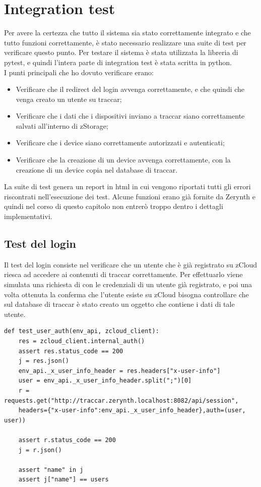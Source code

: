 \documentclass[a4paper,titlepage,12pt]{book}
\begin{document}
\sffamily
\chapter{\sffamily
Integration test}
Per avere la certezza che tutto il sistema sia stato correttamente integrato e che tutto funzioni correttamente, è stato necessario realizzare una suite di test per verificare questo punto. Per testare il sistema è stata utilizzata la libreria di pytest, e quindi l'intera parte di integration test è stata scritta in python.\\
I punti principali che ho dovuto verificare erano:
\begin{itemize}
\item Verificare che il redirect del login avvenga correttamente, e che quindi che venga creato un utente su traccar;

\item Verificare che i dati che i dispositivi inviano a traccar siano correttamente salvati all'interno di zStorage;

\item Verificare che i device siano correttamente autorizzati e autenticati;

\item Verificare che la creazione di un device avvenga correttamente, con la creazione di un device copia nel database di traccar.
\end{itemize}

La suite di test genera un report in html in cui vengono riportati tutti gli errori riscontrati nell'esecuzione dei test. Alcune funzioni erano già fornite da Zerynth e quindi nel corso di questo capitolo non entrerò troppo dentro i dettagli implementativi.

\section{\sffamily
Test del login}
Il test del login consiste nel verificare che un utente che è già registrato su zCloud riesca ad accedere ai contenuti di traccar correttamente. Per effettuarlo viene simulata una richiesta di con le credenziali di un utente già registrato, e poi una volta ottenuta la conferma che l'utente esiste su zCloud bisogna controllare che sul database di traccar è stato creato un oggetto che contiene i dati di tale utente.
\pagebreak

\begin{verbatim}
def test_user_auth(env_api, zcloud_client):
    res = zcloud_client.internal_auth()
    assert res.status_code == 200
    j = res.json()
    env_api._x_user_info_header = res.headers["x-user-info"]
    user = env_api._x_user_info_header.split(";")[0]
    r = requests.get("http://traccar.zerynth.localhost:8082/api/session", 
    headers={"x-user-info":env_api._x_user_info_header},auth=(user, user))
    
    assert r.status_code == 200
    j = r.json()

    assert "name" in j
    assert j["name"] == users
\end{verbatim}
\end{document}
